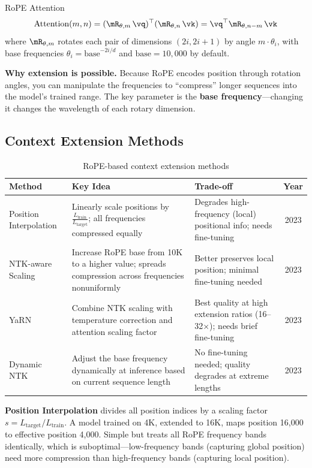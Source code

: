 \begin{mathresult}{RoPE Attention}
\[
\text{Attention}(m, n) = (\mR_{\theta, m}\,\vq)^\top (\mR_{\theta, n}\,\vk) = \vq^\top \mR_{\theta, n-m}\,\vk
\]
where $\mR_{\theta, m}$ rotates each pair of dimensions $(2i, 2i{+}1)$ by angle $m \cdot \theta_i$, with base frequencies $\theta_i = \text{base}^{-2i/d}$ and $\text{base} = 10{,}000$ by default.
\end{mathresult}

\textbf{Why extension is possible.} Because RoPE encodes position through rotation angles, you can manipulate the frequencies to ``compress'' longer sequences into the model's trained range. The key parameter is the \textbf{base frequency}---changing it changes the wavelength of each rotary dimension.

\subsection{Context Extension Methods}

\begin{table}[H]
\centering
\caption{RoPE-based context extension methods}
\begin{tabularx}{\textwidth}{lXXc}
\toprule
\textbf{Method} & \textbf{Key Idea} & \textbf{Trade-off} & \textbf{Year} \\
\midrule
Position Interpolation & Linearly scale positions by $\frac{L_{\text{train}}}{L_{\text{target}}}$; all frequencies compressed equally & Degrades high-frequency (local) positional info; needs fine-tuning & 2023 \\
NTK-aware Scaling & Increase RoPE base from 10K to a higher value; spreads compression across frequencies nonuniformly & Better preserves local position; minimal fine-tuning needed & 2023 \\
YaRN & Combine NTK scaling with temperature correction and attention scaling factor & Best quality at high extension ratios (16--32$\times$); needs brief fine-tuning & 2023 \\
Dynamic NTK & Adjust the base frequency dynamically at inference based on current sequence length & No fine-tuning needed; quality degrades at extreme lengths & 2023 \\
\bottomrule
\end{tabularx}
\end{table}

\textbf{Position Interpolation} divides all position indices by a scaling factor $s = L_{\text{target}} / L_{\text{train}}$. A model trained on 4K, extended to 16K, maps position 16,000 to effective position 4,000. Simple but treats all RoPE frequency bands identically, which is suboptimal---low-frequency bands (capturing global position) need more compression than high-frequency bands (capturing local position).

